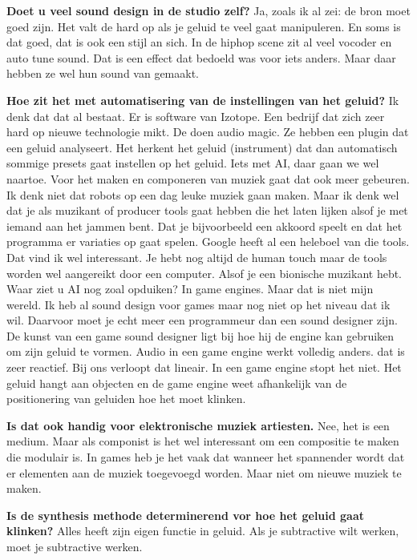 \textbf{Doet u veel sound design in de studio zelf?}\newline
Ja, zoals ik al zei: de bron moet goed zijn.
Het valt de hard op als je geluid te veel gaat manipuleren. En soms is dat goed, dat is ook een stijl an sich. In de hiphop scene zit al veel vocoder en auto tune sound.
Dat is een effect dat bedoeld was voor iets anders. Maar daar hebben ze wel hun sound van gemaakt.

\textbf{Hoe zit het met automatisering van de instellingen van het geluid?}\newline
Ik denk dat dat al bestaat. Er is software van Izotope. Een bedrijf dat zich zeer hard op nieuwe technologie mikt. De doen audio magic.
Ze hebben een plugin dat een geluid analyseert. Het herkent het geluid (instrument) dat dan automatisch sommige presets gaat instellen op het geluid.
Iets met AI, daar gaan we wel naartoe. Voor het maken en componeren van muziek gaat dat ook meer gebeuren.
Ik denk niet dat robots op een dag leuke muziek gaan maken.
Maar ik denk wel dat je als muzikant of producer tools gaat hebben die het laten lijken alsof je met iemand aan het jammen bent.
Dat je bijvoorbeeld een akkoord speelt en dat het programma er variaties op gaat spelen. Google heeft al een heleboel van die tools.
Dat vind ik wel interessant. Je hebt nog altijd de human touch maar de tools worden wel aangereikt door een computer. Alsof je een bionische muzikant hebt. Waar ziet u AI nog zoal opduiken?
In game engines. Maar dat is niet mijn wereld. Ik heb al sound design voor games maar nog niet op het niveau dat ik wil. Daarvoor moet je echt meer een programmeur dan een sound designer zijn.
De kunst van een game sound designer ligt bij hoe hij de engine kan gebruiken om zijn geluid te vormen.
Audio in een game engine werkt volledig anders. dat is zeer reactief. Bij ons verloopt dat lineair. In een game engine stopt het niet.
Het geluid hangt aan objecten en de game engine weet afhankelijk van de positionering van geluiden hoe het moet klinken.

\textbf{Is dat ook handig voor elektronische muziek artiesten.}\newline
Nee, het is een medium. Maar als componist is het wel interessant om een compositie te maken die modulair is.
In games heb je het vaak dat wanneer het spannender wordt dat er elementen aan de muziek toegevoegd worden.
Maar niet om nieuwe muziek te maken.

\textbf{Is de synthesis methode determinerend vor hoe het geluid gaat klinken?}\newline
Alles heeft zijn eigen functie in geluid. Als je subtractive wilt werken, moet je subtractive werken.

